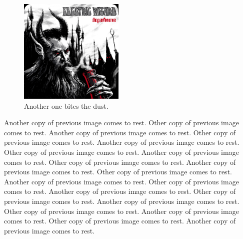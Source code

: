 \documentclass{article}
\begin{document}
    \begin{figure}          %
        \includegraphics[width=5cm]{./dopethrone.jpg}
        \caption{Another one bites the dust.}
    \end{figure}
    Another copy of previous image comes to rest.
    Other copy of previous image comes to rest.
    Another copy of previous image comes to rest.
    Other copy of previous image comes to rest.
    Another copy of previous image comes to rest.
    Other copy of previous image comes to rest.
    Another copy of previous image comes to rest.
    Other copy of previous image comes to rest.
    Another copy of previous image comes to rest.
    Other copy of previous image comes to rest.
    Another copy of previous image comes to rest.
    Other copy of previous image comes to rest.
    Another copy of previous image comes to rest.
    Other copy of previous image comes to rest.
    Another copy of previous image comes to rest.
    Other copy of previous image comes to rest.
    Another copy of previous image comes to rest.
    Other copy of previous image comes to rest.
    Another copy of previous image comes to rest.
\end{document}
